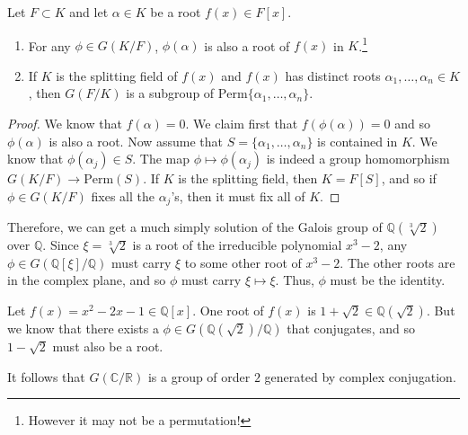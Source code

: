   \begin{lemma}
    Let $F \subset K$ and let $\alpha \in K$ be a root $f(x) \in F[x]$.
    \begin{enumerate}
      \item For any $\phi \in G(K/F)$, $\phi(\alpha)$ is also a root of $f(x)$ in $K$.\footnote{However it may not be a permutation!}
      \item If $K$ is the splitting field of $f(x)$ and $f(x)$ has distinct roots $\alpha_1, \ldots, \alpha_n \in K$, then $G(F/K)$ is a subgroup of $\mathrm{Perm}\{\alpha_1, \ldots, \alpha_n\}$. 
    \end{enumerate}
  \end{lemma}
  \begin{proof}
    We know that $f(\alpha) = 0$. We claim first that $f(\phi(\alpha)) = 0$ and so $\phi(\alpha)$ is also a root. Now assume that $S = \{\alpha_1, \ldots, \alpha_n\}$ is contained in $K$. We know that $\phi(\alpha_j) \in S$. The map $\phi \mapsto \phi(\alpha_j)$ is indeed a group homomorphism $G(K/F) \to \mathrm{Perm}(S)$. If $K$ is the splitting field, then $K = F[S]$, and so if $\phi \in G(K/F)$ fixes all the $\alpha_j$'s, then it must fix all of $K$. 
  \end{proof} 

  \begin{example}
    Therefore, we can get a much simply solution of the Galois group of $\mathbb{Q}(\sqrt[3]{2})$ over $\mathbb{Q}$. Since $\xi = \sqrt[3]{2}$ is a root of the irreducible polynomial $x^3 - 2$, any $\phi \in G(\mathbb{Q}[\xi]/\mathbb{Q})$ must carry $\xi$ to some other root of $x^3 - 2$. The other roots are in the complex plane, and so $\phi$ must carry $\xi \mapsto \xi$. Thus, $\phi$ must be the identity. 
  \end{example}

  \begin{example}
    Let $f(x) = x^2 - 2x - 1 \in \mathbb{Q}[x]$. One root of $f(x)$ is $1 + \sqrt{2} \in \mathbb{Q}(\sqrt{2})$. But we know that there exists a $\phi \in G(\mathbb{Q}(\sqrt{2})/\mathbb{Q})$ that conjugates, and so $1 - \sqrt{2}$ must also be a root. 
  \end{example} 

  \begin{example}
    It follows that $G(\mathbb{C}/\mathbb{R})$ is a group of order $2$ generated by complex conjugation. 
  \end{example} 

